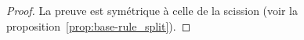 \begin{proof}

	La preuve est symétrique à celle de la scission (voir la proposition~\ref{prop:base-rule_split}).
\end{proof}




